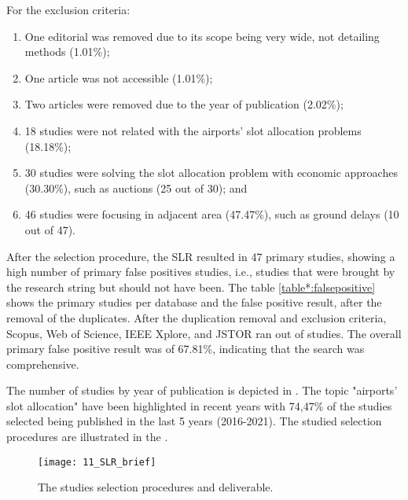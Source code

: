 For the exclusion criteria: 
\begin{enumerate}
    \item One editorial was removed due to its scope being very wide, not detailing methods (1.01\%);
    \item One article was not accessible (1.01\%);
    \item Two articles were removed due to the year of publication (2.02\%);
    \item 18 studies were not related with the airports' slot allocation problems (18.18\%);
    \item 30 studies were solving the slot allocation problem with economic approaches (30.30\%), such as auctions (25 out of 30); and
    \item 46 studies were focusing in adjacent area (47.47\%), such as ground delays (10 out of 47).
\end{enumerate}

After the selection procedure, the SLR resulted in 47 primary studies, showing a high number of primary false positives studies, i.e., studies that were brought by the research string but should not have been. The table \ref{table*:falsepositive} shows the primary studies per database and the false positive result, after the removal of the duplicates. After the duplication removal and exclusion criteria, Scopus, Web of Science, IEEE Xplore, and JSTOR ran out of studies. The overall primary false positive result was of 67.81\%, indicating that the search was comprehensive. 



The number of studies by year of publication is depicted in . The topic "airports' slot allocation" have been highlighted in recent years with 74,47\% of the studies selected being published in the last 5 years (2016-2021). The studied selection procedures are illustrated in the .

%

\begin{wrapfigure}{L}{6cm}
\caption{The studies selection procedures and deliverable.}\label{fig:resumeSLR}
\texttt{[image: 11\_SLR\_brief]}
\end{wrapfigure} 

\lipsum[1-2]


